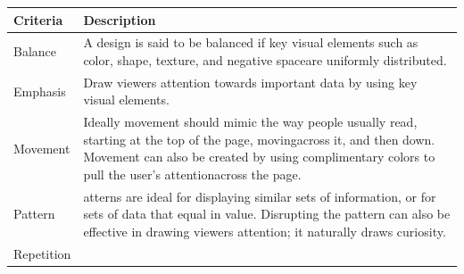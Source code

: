 \documentclass[]{book}
\theoremstyle{definition}
\theoremstyle{definition}
\theoremstyle{definition}
\theoremstyle{remark}
\begin{document}
\begin{longtable}[]{@{}ll@{}}
\toprule
\begin{minipage}[b]{0.16\columnwidth}\raggedright\strut
\textbf{Criteria}\strut
\end{minipage} & \begin{minipage}[b]{0.78\columnwidth}\raggedright\strut
\textbf{Description}\strut
\end{minipage}\tabularnewline
\midrule
\endhead
\begin{minipage}[t]{0.16\columnwidth}\raggedright\strut
Balance\strut
\end{minipage} & \begin{minipage}[t]{0.78\columnwidth}\raggedright\strut
A design is said to be balanced if key visual elements such as color,
shape, texture, and negative spaceare uniformly distributed.\strut
\end{minipage}\tabularnewline
\begin{minipage}[t]{0.16\columnwidth}\raggedright\strut
Emphasis\strut
\end{minipage} & \begin{minipage}[t]{0.78\columnwidth}\raggedright\strut
Draw viewers attention towards important data by using key visual
elements.\strut
\end{minipage}\tabularnewline
\begin{minipage}[t]{0.16\columnwidth}\raggedright\strut
Movement\strut
\end{minipage} & \begin{minipage}[t]{0.78\columnwidth}\raggedright\strut
Ideally movement should mimic the way people usually read, starting at
the top of the page, movingacross it, and then down. Movement can also
be created by using complimentary colors to pull the user's
attentionacross the page.\strut
\end{minipage}\tabularnewline
\begin{minipage}[t]{0.16\columnwidth}\raggedright\strut
Pattern\strut
\end{minipage} & \begin{minipage}[t]{0.78\columnwidth}\raggedright\strut
atterns are ideal for displaying similar sets of information, or for
sets of data that equal in value. Disrupting the pattern can also be
effective in drawing viewers attention; it naturally draws
curiosity.\strut
\end{minipage}\tabularnewline
\begin{minipage}[t]{0.16\columnwidth}\raggedright\strut
Repetition\strut
\end{minipage} & \begin{minipage}[t]{0.78\columnwidth}\raggedright\strut

\end{minipage}
\end{longtable}
\end{document}
